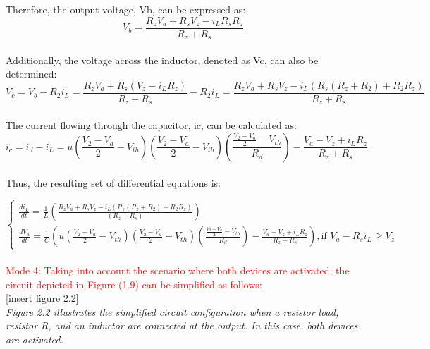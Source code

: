 Therefore, the output voltage, Vb, can be expressed as:\\

\begin{equation}
    V_b=\frac{R_zV_a+R_sV_z-i_LR_sR_z}{R_z+R_s}
\end{equation}\\

Additionally, the voltage across the inductor, denoted as Vc, can also be determined:\\

\begin{equation}
    V_c=V_b-R_2i_L=\frac{R_zV_a+R_s(V_z-i_LR_z)}{R_z+R_s}-R_2i_L=\frac{R_zV_a+R_sV_z-i_L(R_s(R_z+R_2)+R_2R_z)}{R_z+R_s}
\end{equation}\\

The current flowing through the capacitor, ic, can be calculated as:\\

\begin{equation}
    i_c=i_d-i_L=u(\frac{V_2-V_a}{2}-V_{th})(\frac{V_2-V_a}{2}-V_{th})(\frac{\frac{V_2-V_a}{2}-V_{th}}{R_d})-\frac{V_a-V_z+i_LR_z}{R_z+R_s}
\end{equation}\\

Thus, the resulting set of differential equations is:

\begin{equation}
    \begin{cases}
        \frac{di_L}{dt}=\frac{1}{L}(\frac{R_zV_a+R_sV_z-i_L(R_s(R_z+R_2)+R_2R_z)}{(R_z+R_s)})\\
        \frac{dV_a}{dt}=\frac{1}{C}(u(\frac{V_2-V_a}{2}-V_{th})(\frac{V_2-V_a}{2}-V_{th})(\frac{\frac{V_2-V_a}{2}-V_{th}}{R_d})-\frac{V_a-V_z+i_LR_z}{R_z+R_s}),  \text{if } V_a-R_si_L \geq V_z
    \end{cases}
\end{equation}\\

\large\textcolor{red}{Mode 4: Taking into account the scenario where both devices are activated, the circuit depicted in Figure (1.9) can be simplified as follows:}\\

[insert figure 2.2]\\

\emph{Figure 2.2 illustrates the simplified circuit configuration when a resistor load, resistor R, and an inductor are connected at the output. In this case, both devices are activated.}\\

